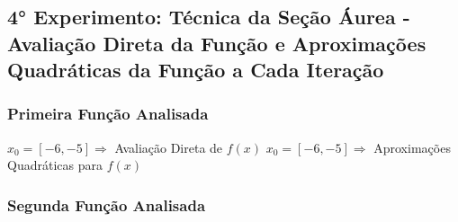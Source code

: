 

\subsection{4° Experimento: Técnica da Seção Áurea - Avaliação Direta da Função e Aproximações Quadráticas da Função a Cada Iteração}
    \subsubsection{Primeira Função Analisada}

    \begin{minipage}[h!]{\linewidth}
            \centering
            $x_0=[-6,-5]\Longrightarrow$  Avaliação Direta de $f(x)$            
            \label{tab:tblt} 
            \writetable{\tblt}
            \bigskip
            \centering
            $x_0=[-6,-5]\Longrightarrow$  Aproximações Quadráticas para $f(x)$
            \label{tab:tblu} 
            \writetable{\tblu}
        \end{minipage}
        
    \subsubsection{Segunda Função Analisada}

\newpage